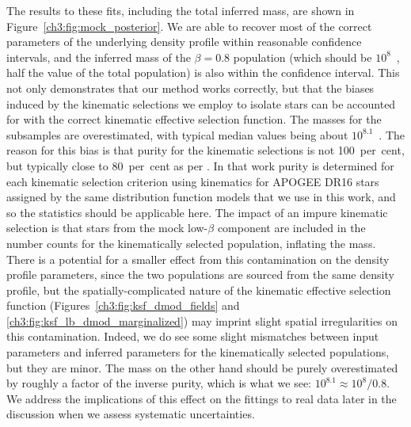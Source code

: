 The results to these fits, including the total inferred mass, are shown in Figure~\ref{ch3:fig:mock_posterior}. We are able to recover most of the correct parameters of the underlying density profile within reasonable confidence intervals, and the inferred mass of the $\beta=0.8$ population (which should be $10^{8}$~\Msun, half the value of the total population) is also within the confidence interval. This not only demonstrates that our method works correctly, but that the biases induced by the kinematic selections we employ to isolate \gse stars can be accounted for with the correct kinematic effective selection function. The masses for the \gse subsamples are overestimated, with typical median values being about $10^{8.1}$~\Msun. The reason for this bias is that purity for the kinematic selections is not 100~per~cent, but typically close to 80~per~cent as per \cite{lane22} \parencite[also see e.g.][]{limberg22}. In that work purity is determined for each kinematic selection criterion using kinematics for APOGEE DR16 stars assigned by the same distribution function models that we use in this work, and so the statistics should be applicable here. The impact of an impure kinematic selection is that stars from the mock low-$\beta$ component are included in the number counts for the kinematically selected population, inflating the mass. There is a potential for a smaller effect from this contamination on the density profile parameters, since the two populations are sourced from the same density profile, but the spatially-complicated nature of the kinematic effective selection function (Figures~\ref{ch3:fig:ksf_dmod_fields} and \ref{ch3:fig:ksf_lb_dmod_marginalized}) may imprint slight spatial irregularities on this contamination. Indeed, we do see some slight mismatches between input parameters and inferred parameters for the kinematically selected populations, but they are minor. The mass on the other hand should be purely overestimated by roughly a factor of the inverse purity, which is what we see: $10^{8.1} \approx 10^{8}/0.8$. We address the implications of this effect on the fittings to real data later in the discussion when we assess systematic uncertainties.

